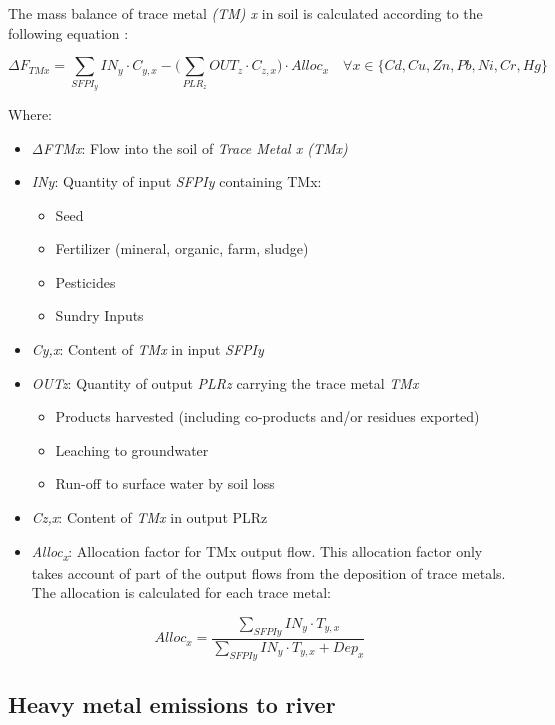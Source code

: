 \documentclass[openany]{book}
\begin{document}
The mass balance of trace metal \emph{(TM) x} in soil is calculated according to the following equation \citep{Koch2015}:

\[\Delta F_{TMx}=\sum_{SFPI_y}IN_y \cdot C_{y,x} - \Big (\sum_{PLR_z} OUT_z \cdot C_{z,x} \Big) \cdot Alloc_x \quad \forall x \in \{Cd,Cu,Zn,Pb,Ni,Cr,Hg\}\]

Where:

\begin{itemize}
\item
  \emph{ΔFTMx}: Flow into the soil of \emph{Trace Metal x (TMx)}
\item
  \emph{INy}: Quantity of input \emph{SFPIy} containing TMx:

  \begin{itemize}
  \item
    Seed
  \item
    Fertilizer (mineral, organic, farm, sludge)
  \item
    Pesticides
  \item
    Sundry Inputs
  \end{itemize}
\item
  \emph{Cy,x}: Content of \emph{TMx} in input \emph{SFPIy}
\item
  \emph{OUTz}: Quantity of output \emph{PLRz} carrying the trace metal \emph{TMx}

  \begin{itemize}
  \item
    Products harvested (including co-products and/or residues exported)
  \item
    Leaching to groundwater
  \item
    Run-off to surface water by soil loss
  \end{itemize}
\item
  \emph{Cz,x}: Content of \emph{TMx} in output PLRz
\item
  \emph{Alloc\textsubscript{x}}: Allocation factor for TMx output flow. This allocation factor only takes account of part of the output flows from the deposition of trace metals. The allocation is calculated for each trace metal:
\end{itemize}

\[Alloc_x = \frac{ \sum_{SFPIy}IN_y \cdot T_{y,x}}{ \sum_{SFPIy} IN_y \cdot T_{y,x} + Dep_x}\]

\hypertarget{heavy-metal-emissions-to-river}{%
\subsection{Heavy metal emissions to river}\label{heavy-metal-emissions-to-river}}
\end{document}
